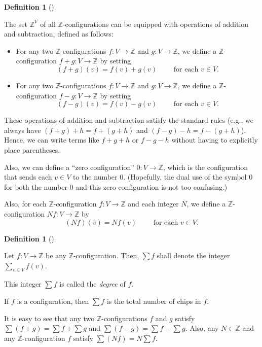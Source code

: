 \documentclass[numbers=enddot,12pt,final,onecolumn,notitlepage]{scrartcl}%
\theoremstyle{definition}
\newtheorem{defi}[theo]{Definition}
\newenvironment{definition}[1][]
{\begin{defi}[#1]\begin{leftbar}}
{\end{leftbar}\end{defi}}
\let\sumnonlimits\sum
\renewcommand{\sum}{\sumnonlimits\limits}
\newcommand{\ZZ}{\mathbb{Z}}
\newcommand{\tup}[1]{\left( #1 \right)}
\begin{document}
\begin{definition} \label{def.chip.add-configs}
The set $\ZZ^V$ of all $\ZZ$-configurations can be equipped with
operations of addition and subtraction, defined as follows:

\begin{itemize}
 \item For any two $\ZZ$-configurations $f : V \to \ZZ$ and
       $g : V \to \ZZ$, we define a $\ZZ$-configuration
       $f + g : V \to \ZZ$ by setting
       \[
        \tup{f + g} \tup{v}
        = f \tup{v} + g \tup{v}
        \qquad \text{ for each } v \in V .
       \]

 \item For any two $\ZZ$-configurations $f : V \to \ZZ$ and
       $g : V \to \ZZ$, we define a $\ZZ$-configuration
       $f - g : V \to \ZZ$ by setting
       \[
        \tup{f - g} \tup{v}
        = f \tup{v} - g \tup{v}
        \qquad \text{ for each } v \in V .
       \]
\end{itemize}

These operations of addition and subtraction satisfy the
standard rules (e.g., we always have
$\tup{f+g} + h = f + \tup{g+h}$ and
$\tup{f-g} - h = f - \tup{g+h}$).
Hence, we can write terms like $f + g + h$ or $f - g - h$
without having to explicitly place parentheses.

Also, we can define a ``zero configuration'' $0 : V \to \ZZ$,
which is the configuration that sends each $v \in V$ to the
number $0$.
(Hopefully, the dual use of the symbol $0$ for both the number
$0$ and this zero configuration is not too confusing.)

Also, for each $\ZZ$-configuration $f : V \to \ZZ$ and each
integer $N$, we define a $\ZZ$-configuration $Nf : V \to \ZZ$
by
\[
\tup{Nf} \tup{v} = N f \tup{v}
\qquad \text{ for each } v \in V .
\]
\end{definition}

\begin{definition}
Let $f : V \to \ZZ$ be any $\ZZ$-configuration.
Then, $\sum f$ shall denote the integer
$\sum_{v \in V} f \tup{v}$.

This integer $\sum f$ is called the \textit{degree} of $f$.
\end{definition}

If $f$ is a configuration, then $\sum f$ is the total
number of chips in $f$.

It is easy to see that any two $\ZZ$-configurations $f$ and
$g$ satisfy $\sum \tup{f+g} = \sum f + \sum g$ and
$\sum \tup{f-g} = \sum f - \sum g$.
Also, any $N \in \ZZ$ and any $\ZZ$-configuration $f$
satisfy $\sum \tup{Nf} = N \sum f$.
\end{document}
